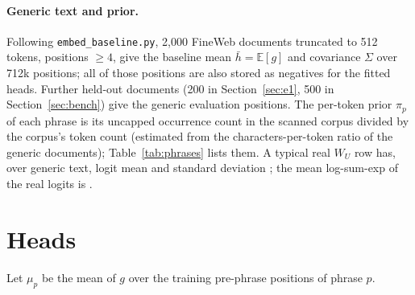 \documentclass[11pt]{article}
\newcommand{\WU}{W_U}
\renewcommand{\hbar}{\bar{h}}
\begin{document}
\paragraph{Generic text and prior.}
Following \texttt{embed\_baseline.py}, 2{,}000 FineWeb documents truncated to 512 tokens, positions $\ge 4$, give the baseline mean $\hbar=\mathbb{E}[g]$ and covariance $\Sigma$ over 712k positions; all of those positions are also stored as negatives for the fitted heads. Further held-out documents (200 in Section~\ref{sec:e1}, 500 in Section~\ref{sec:bench}) give the generic evaluation positions. The per-token prior $\pi_p$ of each phrase is its uncapped occurrence count in the scanned corpus divided by the corpus's token count (estimated from the characters-per-token ratio of the generic documents); Table~\ref{tab:phrases} lists them. A typical real $\WU$ row has, over generic text, logit mean \EoneWuMean{} and standard deviation \EoneWuStd{}; the mean log-sum-exp of the real logits is \EoneLse{}.



\section{Heads}
\label{sec:heads}
Let $\mu_p$ be the mean of $g$ over the training pre-phrase positions of phrase $p$.
\end{document}
